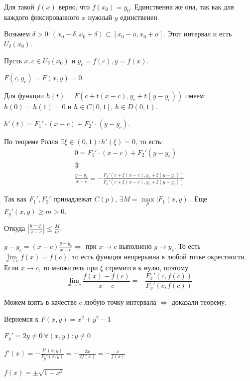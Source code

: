 Для такой \( f(x) \) верно, что \( f(x_0) = y_0 \).
Единственна же она, так как для каждого фиксированного \( x \) нужный \( y \) единственен.

Возьмем \( \delta > 0 : (x_0 - \delta, x_0 + \delta) \subset [x_0 - a, x_0 + a] \).
Этот интервал и есть \( U_{\delta} (x_0) \).

Пусть \( x, c \in U_{\delta} (x_0) \) и \( y_c = f(c), y = f(x) \).

\( F(c, y_c) = F(x, y) = 0 \).

Для функции \( h(t) = F(c + t(x - c), y_c + t(y - y_c)) \) имеем:
\( h(0) = h(1) = 0 \) и \( h \in C[0, 1] \), \( h \in D(0, 1) \).

\( h'(t) = F_1' \cdot (x - c) + F_2' \cdot (y - y_c) \).

По теореме Ролля \( \exists \xi \in (0, 1) : h'(\xi) = 0 \), то есть:
\begin{gather*}
    0 = F_1' \cdot (x - c) + F_2' (y - y_c)
    \\
    \Updownarrow
    \\
    \frac{y - y_c}{x - c} = - \frac{F_1'(c + \xi (x - c), y_c + \xi (y - y_c))}{F_2'(c + \xi (x - c), y_c + \xi (y - y_c))}
\end{gather*}

Так как \( F_1', F_2' \) принадлежат \( C(p) \), \( \exists M = \max\limits_{p} | F_1 (x, y) | \).
Еще \( F_y'(x, y) \geq m > 0 \).

Откуда \( \left| \frac{y - y_c}{x - c} \right| \leq \frac{M}{m} \).

\( y - y_c = (x - c) \frac{y - y_c}{x - c} \Rightarrow \) при \( x \to c \) выполнено \( y \to y_c \).
То есть \( \lim\limits_{x \to c} f(x) = f(c) \), то есть функция непрерывна в любой точке окрестности.
Если \( x \to c \), то множитель при \( \xi \) стремится к нулю, поэтому
\[
    \lim\limits_{x \to c} \frac{f(x) - f(c)}{x - c} = - \frac{F_x'(c, f(c))}{F_y'(c, f(c))}
\]

Можем взять в качестве \( c \) любую точку интервала \( \Rightarrow \) доказали теорему.

\begin{example}{}{}
    Вернемся к \( F(x, y) = x^2 + y^2 - 1 \)

    \( F_y' = 2y \neq 0 \ \forall (x, y) : y \neq 0 \)

    \( f'(x) = -\frac{F'(x, y)}{F_y'(x, y)} = -\frac{2x}{2f(x)} = -\frac{x}{f(x)} \)

    \( f(x) = \pm \sqrt{1 - x^2} \)
\end{example}

